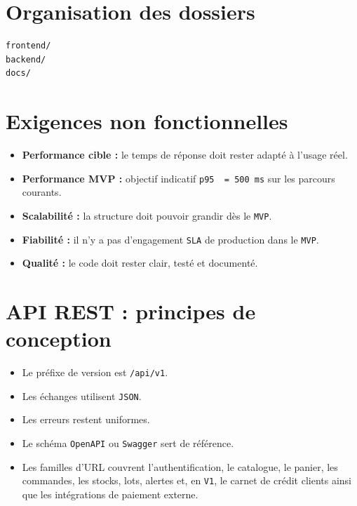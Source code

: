 \documentclass[11pt,a4paper]{scrreprt}
\newcommand{\code}[1]{\texttt{#1}}
\begin{document}
\section{Organisation des dossiers}
\begin{lstlisting}
frontend/
backend/
docs/
\end{lstlisting}

\section{Exigences non fonctionnelles}
\begin{itemize}
  \item \textbf{Performance cible :} le temps de réponse doit rester adapté à l'usage réel.
  \item \textbf{Performance MVP :} objectif indicatif \code{p95 ~= 500 ms} sur les parcours courants.
  \item \textbf{Scalabilité :} la structure doit pouvoir grandir dès le \code{MVP}.
  \item \textbf{Fiabilité :} il n'y a pas d'engagement \code{SLA} de production dans le \code{MVP}.
  \item \textbf{Qualité :} le code doit rester clair, testé et documenté.
\end{itemize}

\section{API REST : principes de conception}
\begin{itemize}
  \item Le préfixe de version est \code{/api/v1}.
  \item Les échanges utilisent \code{JSON}.
  \item Les erreurs restent uniformes.
  \item Le schéma \code{OpenAPI} ou \code{Swagger} sert de référence.
  \item Les familles d'URL couvrent l'authentification, le catalogue, le panier, les commandes, les stocks, lots, alertes et, en \code{V1}, le carnet de crédit clients ainsi que les intégrations de paiement externe.
\end{itemize}
\end{document}
